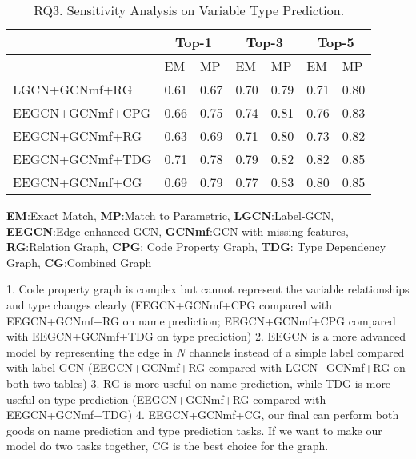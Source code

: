 \begin{table}[t]
	\caption{RQ3. Sensitivity Analysis on Variable Type Prediction.}
	\begin{center}
		\small
		\renewcommand{\arraystretch}{1} \begin{tabular}{p{2.5cm}<{\centering}|p{0.5cm}<{\centering}|p{0.5cm}<{\centering}|p{0.5cm}<{\centering}|p{0.5cm}<{\centering}|p{0.5cm}<{\centering}|p{0.5cm}<{\centering}}
			
			\hline
			& \multicolumn{2}{c}{Top-1}         & \multicolumn{2}{c}{Top-3}         & \multicolumn{2}{c}{Top-5} \\
			\hline
			& EM & MP & EM & MP & EM & MP  \\ 
			\hline
			LGCN+GCNmf+RG   & 0.61 & 0.67 & 0.70 & 0.79 & 0.71 & 0.80 \\
			EEGCN+GCNmf+CPG & 0.66 & 0.75 & 0.74 & 0.81 & 0.76 & 0.83 \\
			EEGCN+GCNmf+RG  & 0.63 & 0.69 & 0.71 & 0.80 & 0.73 & 0.82 \\
			EEGCN+GCNmf+TDG & 0.71 & 0.78 & 0.79 & 0.82 & 0.82 & 0.85 \\
			EEGCN+GCNmf+CG  & 0.69 & 0.79 & 0.77 & 0.83 & 0.80 & 0.85 \\
			\hline
		\end{tabular}
		\label{RQ3-result-2}
		{\bf EM}:Exact Match, {\bf MP}:Match to Parametric, {\bf LGCN}:Label-GCN, {\bf EEGCN}:Edge-enhanced GCN, {\bf GCNmf}:GCN with missing features, {\bf RG}:Relation Graph, {\bf CPG}: Code Property Graph, {\bf TDG}: Type Dependency Graph, {\bf CG}:Combined Graph
	\end{center}
\end{table}

1. Code property graph is complex but cannot represent the variable relationships and type changes clearly (EEGCN+GCNmf+CPG compared with EEGCN+GCNmf+RG on name prediction; EEGCN+GCNmf+CPG compared with EEGCN+GCNmf+TDG on type prediction)
2. EEGCN is a more advanced model by representing the edge in $N$ channels instead of a simple label compared with label-GCN (EEGCN+GCNmf+RG compared with LGCN+GCNmf+RG on both two tables)
3. RG is more useful on name prediction, while TDG is more useful on type prediction (EEGCN+GCNmf+RG compared with EEGCN+GCNmf+TDG)
4. EEGCN+GCNmf+CG, our final {\tool} can perform both goods on name prediction and type prediction tasks. If we want to make our model do two tasks together, CG is the best choice for the graph.

